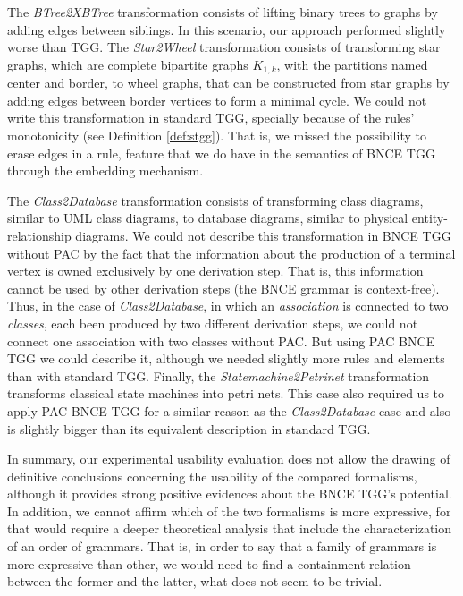 The \emph{BTree2XBTree} transformation consists of lifting binary trees to graphs by adding edges between siblings. In this scenario, our approach performed slightly worse than TGG. The \emph{Star2Wheel} transformation consists of transforming star graphs, which are complete bipartite graphs $K_{1,k}$, with the partitions named center and border, to wheel graphs, that can be constructed from star graphs by adding edges between border vertices to form a minimal cycle. We could not write this transformation in standard TGG, specially because of the rules' monotonicity (see Definition \ref{def:stgg}). That is, we missed the possibility to erase edges in a rule, feature that we do have in the semantics of BNCE TGG through the embedding mechanism.

The \emph{Class2Database} transformation consists of transforming class diagrams, similar to UML class diagrams, to database diagrams, similar to physical entity-relationship diagrams. We could not describe this transformation in BNCE TGG without PAC by the fact that the information about the production of a terminal vertex is owned exclusively by one derivation step. That is, this information cannot be used by other derivation steps (the BNCE grammar is context-free). Thus, in the case of \emph{Class2Database}, in which an \textit{association} is connected to two \textit{classes}, each been produced by two different derivation steps, we could not connect one association with two classes without PAC. But using PAC BNCE TGG we could describe it, although we needed slightly more rules and elements than with standard TGG. Finally, the \emph{Statemachine2Petrinet} transformation transforms classical state machines into petri nets. This case also required us to apply PAC BNCE TGG for a similar reason as the \emph{Class2Database} case and also is slightly bigger than its equivalent description in standard TGG.

In summary, our experimental usability evaluation does not allow the drawing of definitive conclusions concerning the usability of the compared formalisms, although it provides strong positive evidences about the BNCE TGG's potential. In addition, we cannot affirm which of the two formalisms is more expressive, for that would require a deeper theoretical analysis that include the characterization of an order of grammars. That is, in order to say that a family of grammars is more expressive than other, we would need to find a containment relation between the former and the latter, what does not seem to be trivial.

